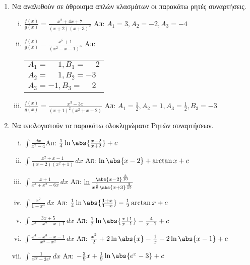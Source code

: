 







\begin{center}
\end{center}

\vspace{2\baselineskip}
\everymath{\displaystyle}
\pagestyle{empty}

\begin{enumerate}

\item Να αναλυθούν σε άθροισμα απλών κλασμάτων οι παρακάτω ρητές συναρτήσεις.

\begin{enumerate}[i)]
\item $\frac{f(x)}{g(x)}=\frac{x^2+4x+7}{(x+2)(x+3)^2}$ \hfill Απ: $A_1=3, A_2=-2, A_3=-4$
\item $\frac{f(x)}{g(x)}=\frac{x^5+1}{(x^2-x-1)^3}$ \hfill Απ: \begin{tabular}{l} 
$A_1=\phantom{-}1, B_1=\phantom{-}2$ \\ $A_2=\phantom{-}1, B_2=-3$ \\ $A_3=-1, B_3=\phantom{-}2$
\end{tabular}
\item $\frac{f(x)}{g(x)}=\frac{x^3-3x}{(x+1)^2(x^2+x+2)}$ \hfill Απ: $A_1=\frac{1}{2}, A_2=1, A_3=\frac{1}{2}, B_3=-3$
\end{enumerate}

\item Να υπολογιστούν τα παρακάτω ολοκληρώματα Ρητών συναρτήσεων.

\begin{enumerate}[i)]
\item $\int\frac{dx}{x^2-4}$\hfill Απ: $\frac{1}{4}\ln\abs{\frac{x-2}{x+2}}+c$
\item $\int\frac{x^2+x-1}{(x-2)(x^2+1)}\,dx$ \hfill Απ: $\ln\abs{x-2}+\arctan x+c$
\item $\int\frac{x+1}{x^3+x^2-6x}\,dx$ \hfill Απ: $\ln\frac{\abs{x-2}^{\frac{3}{10}}}{x^{\frac{1}{6}}\abs{x+3}^{\frac{2}{15}}}$
\item $\int\frac{x^2}{1-x^4}\,dx$ \hfill Απ: $\frac{1}{4}\ln\abs{\frac{1+x}{1-x}}-\frac{1}{2}\arctan x+c$
\item $\int\frac{3x+5}{x^3-x^2-x+1}\, dx$ \hfill Απ: $\frac{1}{2}\ln\abs{\frac{x+1}{x-1}}-\frac{4}{x-1}+c$ 
\item $\int\frac{x^4-x^3-x-1}{x^3-x^2}\,dx$ \hfill Απ: $\frac{x^2}{2}+2\ln\abs{x}-\frac{1}{x}-2\ln\abs{x-1}+c$
\item $\int\frac{1}{e^{2x}-3e^{x}}\,dx$ \hfill Απ: $-\frac{2}{9}x+\frac{1}{9}\ln\abs{e^x-3}+c$
\end{enumerate}


\end{enumerate}
